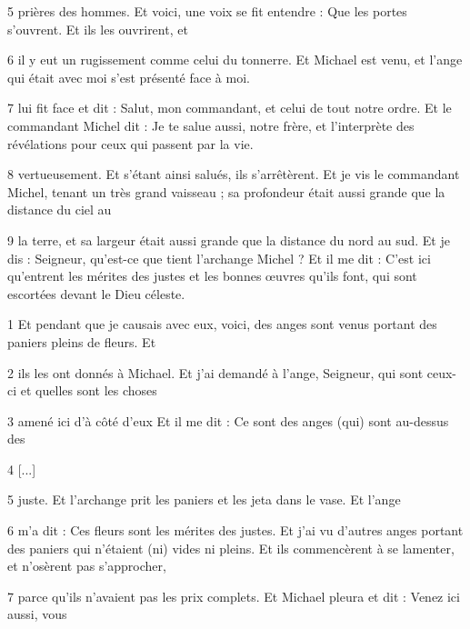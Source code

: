 \par 5 prières des hommes. Et voici, une voix se fit entendre : Que les portes s'ouvrent. Et ils les ouvrirent, et

\par 6 il y eut un rugissement comme celui du tonnerre. Et Michael est venu, et l'ange qui était avec moi s'est présenté face à moi.

\par 7 lui fit face et dit : Salut, mon commandant, et celui de tout notre ordre. Et le commandant Michel dit : Je te salue aussi, notre frère, et l'interprète des révélations pour ceux qui passent par la vie.

\par 8 vertueusement. Et s'étant ainsi salués, ils s'arrêtèrent. Et je vis le commandant Michel, tenant un très grand vaisseau ; sa profondeur était aussi grande que la distance du ciel au

\par 9 la terre, et sa largeur était aussi grande que la distance du nord au sud. Et je dis : Seigneur, qu'est-ce que tient l'archange Michel ? Et il me dit : C'est ici qu'entrent les mérites des justes et les bonnes œuvres qu'ils font, qui sont escortées devant le Dieu céleste.


\par 1 Et pendant que je causais avec eux, voici, des anges sont venus portant des paniers pleins de fleurs. Et

\par 2 ils les ont donnés à Michael. Et j'ai demandé à l'ange, Seigneur, qui sont ceux-ci et quelles sont les choses

\par 3 amené ici d'à côté d'eux Et il me dit : Ce sont des anges (qui) sont au-dessus des

\par 4 [...]

\par 5 juste. Et l'archange prit les paniers et les jeta dans le vase. Et l'ange

\par 6 m'a dit : Ces fleurs sont les mérites des justes. Et j'ai vu d'autres anges portant des paniers qui n'étaient (ni) vides ni pleins. Et ils commencèrent à se lamenter, et n'osèrent pas s'approcher,

\par 7 parce qu'ils n'avaient pas les prix complets. Et Michael pleura et dit : Venez ici aussi, vous

